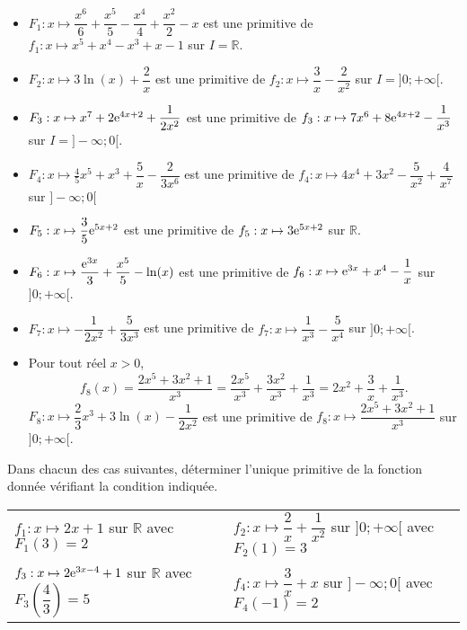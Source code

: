 \documentclass[11pt,fleqn, openany]{book} %
\begin{document}
\begin{solution}\hspace{0pt}

\begin{itemize}\item \(F_1:x\mapsto \dfrac{x^6}{6} + \dfrac{x^5}{5}-\dfrac{x^4}{4}+\dfrac{x^2}{2}-x\) est une primitive de  \(f_1 : x\mapsto x^5 + x^4 - x^3 + x -1\) sur \(I=\mathbb{R}\).
\vskip5pt
\item \(F_2:x\mapsto 3\ln(x) +\dfrac{2}{x}\) est une primitive de \(f_2:x \mapsto \dfrac{3}{x}-\dfrac{2}{x^2}\) sur \(I=]0;+\infty[\).
\vskip5pt
\item \(F_3:x \mapsto x^7 + 2 \mathrm{e}^{4x+2} + \dfrac{1}{2x^2}\) est une primitive de \(f_3:x \mapsto 7x^6+8\mathrm{e}^{4x+2}-\dfrac{1}{x^3}\) sur \(I=]-\infty;0[\).
\vskip5pt
\item  \(F_4:x\mapsto \frac{4}{5}x^5 + x^3 + \dfrac{5}{x} - \dfrac{2}{3x^6}\) est une primitive de \(f_4:x\mapsto 4x^4+3x^2-\dfrac{5}{x^2}+\dfrac{4}{x^7}\) sur \(]-\infty;
0[\)
\vskip5pt
\item \(F_5:x\mapsto \dfrac{3}{5}\mathrm{e}^{5x+2}\) est une primitive de \(f_5:x\mapsto 3\mathrm{e}^{5x+2}\) sur \(\mathbb{R}\).
\vskip5pt
\item \(F_6:x\mapsto \dfrac{\mathrm{e}^{3x}}{3} + \dfrac{x^5}{5} - \ln(x)\) est une primitive de \(f_6:x\mapsto \mathrm{e}^{3x}+x^4-\dfrac{1}{x}\) sur \(]0;+\infty[\).
\vskip5pt
\item \(F_7:x\mapsto -\dfrac{1}{2x^2}+\dfrac{5}{3x^3}\) est une primitive de \(f_7:x \mapsto \dfrac{1}{x^3}-\dfrac{5}{x^4}\) sur \(]0;+\infty[\).
\vskip5pt
\item Pour tout réel \(x>0\), \[f_8(x)=\dfrac{2x^5+3x^2+1}{x^3}=\dfrac{2x^5}{x^3}+\dfrac{3x^2}{x^3}+\dfrac{1}{x^3}=2x^2+\dfrac{3}{x}+\dfrac{1}{x^3}.\]
\(F_8:x\mapsto \dfrac{2}{3}x^3+3\ln (x) - \dfrac{1}{2x^2}\) est une primitive de \(f_8:x\mapsto \dfrac{2x^5+3x^2+1}{x^3}\) sur \(]0;+\infty[\).
\end{itemize}\end{solution}



\begin{exercise}Dans chacun des cas suivantes, déterminer l'unique primitive de la fonction donnée vérifiant la condition indiquée.

\renewcommand{\arraystretch}{2}
\begin{tabularx}{\linewidth}{XX}
 $f_1 : x\mapsto 2x+1$ sur $\mathbb{R}$ avec $F_1(3)=2$
&
 $f_2:x \mapsto \dfrac{2}{x}+\dfrac{1}{x^2}$ sur $]0;+\infty[$ avec $F_2(1)=3$
\\
$f_3:x \mapsto 2\mathrm{e}^{3x-4}+1$ sur $\mathbb{R}$ avec $F_3\left(\dfrac{4}{3}\right)=5$
& $f_4 : x \mapsto \dfrac{3}{x}+x$ sur $]-\infty ; 0[$ avec $F_4(-1)=2$
\end{tabularx}

\end{exercise}
\end{document}
